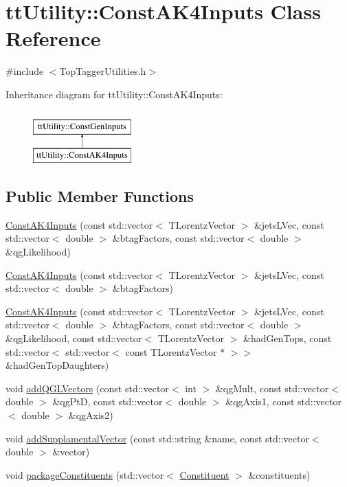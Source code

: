 \hypertarget{classttUtility_1_1ConstAK4Inputs}{\section{tt\-Utility\-:\-:Const\-A\-K4\-Inputs Class Reference}
\label{classttUtility_1_1ConstAK4Inputs}
}


{\ttfamily \#include $<$Top\-Tagger\-Utilities.\-h$>$}

Inheritance diagram for tt\-Utility\-:\-:Const\-A\-K4\-Inputs\-:\begin{figure}[H]
\begin{center}
\leavevmode
\includegraphics[height=2.000000cm]{classttUtility_1_1ConstAK4Inputs}
\end{center}
\end{figure}
\subsection*{Public Member Functions}
\begin{DoxyCompactItemize}
\item 
\hyperlink{classttUtility_1_1ConstAK4Inputs_ad0e86d264508a72505aeb1b3494fd938}{Const\-A\-K4\-Inputs} (const std\-::vector$<$ T\-Lorentz\-Vector $>$ \&jets\-L\-Vec, const std\-::vector$<$ double $>$ \&btag\-Factors, const std\-::vector$<$ double $>$ \&qg\-Likelihood)
\item 
\hyperlink{classttUtility_1_1ConstAK4Inputs_ac6216883dca5dcb2d0d5b1263cd6482e}{Const\-A\-K4\-Inputs} (const std\-::vector$<$ T\-Lorentz\-Vector $>$ \&jets\-L\-Vec, const std\-::vector$<$ double $>$ \&btag\-Factors)
\item 
\hyperlink{classttUtility_1_1ConstAK4Inputs_adbf97c650df9cea213968e7daa878e32}{Const\-A\-K4\-Inputs} (const std\-::vector$<$ T\-Lorentz\-Vector $>$ \&jets\-L\-Vec, const std\-::vector$<$ double $>$ \&btag\-Factors, const std\-::vector$<$ double $>$ \&qg\-Likelihood, const std\-::vector$<$ T\-Lorentz\-Vector $>$ \&had\-Gen\-Tops, const std\-::vector$<$ std\-::vector$<$ const T\-Lorentz\-Vector $\ast$ $>$$>$ \&had\-Gen\-Top\-Daughters)
\item 
void \hyperlink{classttUtility_1_1ConstAK4Inputs_a1f0268275cbc047d7a689ceb9ab5ff78}{add\-Q\-G\-L\-Vectors} (const std\-::vector$<$ int $>$ \&qg\-Mult, const std\-::vector$<$ double $>$ \&qg\-Pt\-D, const std\-::vector$<$ double $>$ \&qg\-Axis1, const std\-::vector$<$ double $>$ \&qg\-Axis2)
\item 
void \hyperlink{classttUtility_1_1ConstAK4Inputs_a528690054575d44f293e984b70cb2856}{add\-Supplamental\-Vector} (const std\-::string \&name, const std\-::vector$<$ double $>$ \&vector)
\item 
void \hyperlink{classttUtility_1_1ConstAK4Inputs_ae1171e58b4a1ca748d7b3abd87476047}{package\-Constituents} (std\-::vector$<$ \hyperlink{classConstituent}{Constituent} $>$ \&constituents)
\end{DoxyCompactItemize}
